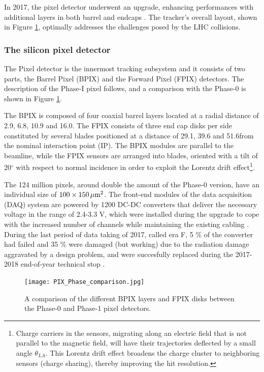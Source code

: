 In 2017, the pixel detector underwent an upgrade, enhancing performances with additional layers in both barrel and endcaps \cite{CMS-TDR-11}.
The tracker's overall layout, shown in Figure \ref{fig:PIX_Phase_comparison}, optimally addresses the challenges posed by the LHC collisions.

\subsubsection{The silicon pixel detector}
The Pixel detector is the innermost tracking subsystem and it consists of two parts, the Barrel Pixel (BPIX) and the Forward Pixel (FPIX) detectors.
The description of the Phase-I pixel follows, and a comparison with the Phase-0 is shown in Figure \ref{fig:PIX_Phase_comparison}.

The BPIX is composed of four coaxial barrel layers located at a radial distance of 2.9, 6.8, 10.9 and 16.0\cm.
The FPIX consists of three end cap disks per side constituted by several blades positioned at a distance of 29.1, 39.6 and 51.6\cm from the nominal interaction point (IP).
The BPIX modules are parallel to the beamline, while the FPIX sensors are arranged into blades, oriented with a tilt of 20$^{\circ}$ with respect to normal incidence in order to exploit the Lorentz drift effect\footnote{
Charge carriers in the sensors, migrating along an electric field that is not parallel to the magnetic field, will have their trajectories deflected by a small angle $\theta_{LA}$.
This Lorentz drift effect broadens the charge cluster to neighboring sensors (charge sharing), thereby improving the hit resolution.
}.

The 124 million pixels, around double the amount of the Phase-0 version, have an individual size of $100 \times 150 \,\mu\text{m}^2$.
The front-end modules of the data acquisition (DAQ) system are powered by 1200 DC-DC converters that deliver the necessary voltage in the range of 2.4-3.3 V,
which were installed during the upgrade to cope with the increased number of channels while maintaining the existing cabling \cite{Feld_2015}.
During the last period of data taking of 2017, called era F, 5 \% of the converter had failed and 35 \% were damaged (but working) due to the radiation damage aggravated by a design problem, and were succesfully replaced during the 2017-2018 end-of-year technical stop \cite{CMS:dcdc-failure-short}.

\begin{figure}[thb]
  \centering
  \texttt{[image: PIX\_Phase\_comparison.jpg]}
  \caption{A comparison of the different BPIX layers and FPIX disks between the Phase-0 and Phase-1 pixel detectors.}
  \label{fig:PIX_Phase_comparison}
\end{figure}

